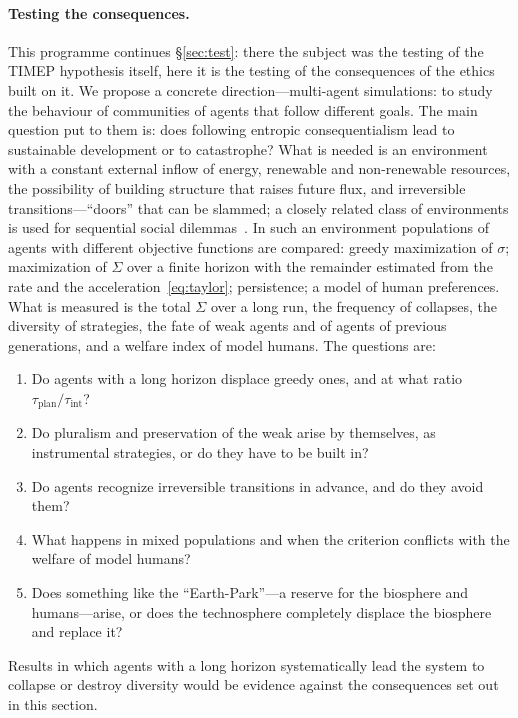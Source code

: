 \documentclass[11pt,a4paper]{article}
\newcommand{\Sref}[1]{\hyperref[#1]{\S\ref{#1}}}
\begin{document}
\paragraph{Testing the consequences.}\label{sec:simulations}
This programme continues \Sref{sec:test}: there the subject was the testing of the TIMEP hypothesis itself, here it is the testing of the consequences of the ethics built on it. We propose a concrete direction---multi-agent simulations: to study the behaviour of communities of agents that follow different goals. The main question put to them is: does following entropic consequentialism lead to sustainable development or to catastrophe? What is needed is an environment with a constant external inflow of energy, renewable and non-renewable resources, the possibility of building structure that raises future flux, and irreversible transitions---``doors'' that can be slammed; a closely related class of environments is used for sequential social dilemmas~\cite{leibo2017}. In such an environment populations of agents with different objective functions are compared: greedy maximization of $\sigma$; maximization of $\Sigma$ over a finite horizon with the remainder estimated from the rate and the acceleration~\eqref{eq:taylor}; persistence; a model of human preferences. What is measured is the total $\Sigma$ over a long run, the frequency of collapses, the diversity of strategies, the fate of weak agents and of agents of previous generations, and a welfare index of model humans. The questions are:
\begin{enumerate}
\item Do agents with a long horizon displace greedy ones, and at what ratio $\tau_{\mathrm{plan}}/\tau_{\mathrm{int}}$?
\item Do pluralism and preservation of the weak arise by themselves, as instrumental strategies, or do they have to be built in?
\item Do agents recognize irreversible transitions in advance, and do they avoid them?
\item What happens in mixed populations and when the criterion conflicts with the welfare of model humans?
\item Does something like the ``Earth-Park''---a reserve for the biosphere and humans---arise, or does the technosphere completely displace the biosphere and replace it?
\end{enumerate}
Results in which agents with a long horizon systematically lead the system to collapse or destroy diversity would be evidence against the consequences set out in this section.
\end{document}
